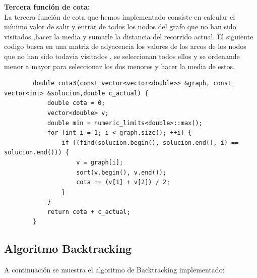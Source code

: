 \documentclass[11pt,openany]{book}
\begin{document}
    \textbf{Tercera función de cota:} \\
    La tercera función de cota que hemos implementado consiste en calcular el mínimo valor de salir y entrar  de todos los nodos del grafo que no 
    han sido visitados ,hacer la media  y sumarle la distancia del recorrido actual.
    El siguiente codigo busca en una matriz de adyacencia los valores de los arcos de los nodos que no han sido todavia visitados , se 
    seleccionan todos ellos y se ordenande menor a mayor para seleccionar los dos menores y hacer la media de estos.
    \begin{lstlisting}
        double cota3(const vector<vector<double>> &graph, const vector<int> &solucion,double c_actual) {
            double cota = 0;
            vector<double> v;
            double min = numeric_limits<double>::max();
            for (int i = 1; i < graph.size(); ++i) {
                if ((find(solucion.begin(), solucion.end(), i) == solucion.end())) {
                    v = graph[i];
                    sort(v.begin(), v.end());
                    cota += (v[1] + v[2]) / 2;
                }
            }
            return cota + c_actual;
        }
    \end{lstlisting}
\subsection{Algoritmo Backtracking}
A continuación se muestra el algoritmo de Backtracking implementado:
\end{document}
